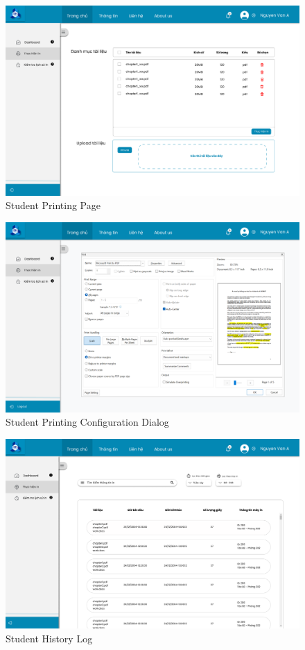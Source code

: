 \begin{figure}[H]
    \centering
    \includegraphics[width = \textwidth, ]{images/UI/Bảng in sinh viên.png}
    \caption{Student Printing Page}
\end{figure}  

\begin{figure}[H]
    \centering
    \includegraphics[width = \textwidth, ]{images/UI/Bảng in sinh viên 2.png}
    \caption{Student Printing Configuration Dialog}
\end{figure}  

\begin{figure}[H]
    \centering
    \includegraphics[width = \textwidth, ]{images/UI/Tra lịch sử sinh viên.png}
    \caption{Student History Log}
\end{figure}  

